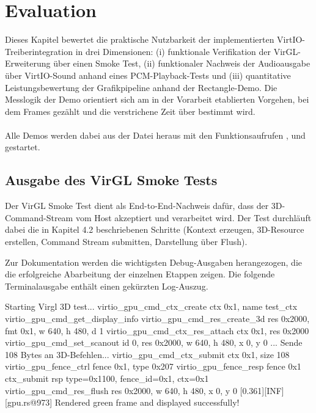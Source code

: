 \chapter{Evaluation}

Dieses Kapitel bewertet die praktische Nutzbarkeit der implementierten VirtIO-Treiberint\-egration in drei Dimensionen: (i) funktionale Verifikation der VirGL-Erweiterung über einen Smoke Test, (ii) funktionaler Nachweis der Audioausgabe über VirtIO-Sound anhand eines PCM-Playback-Tests und (iii) quantitative Leistungsbewertung der Grafikpipeline anhand der Rectangle-Demo. Die Messlogik der Demo orientiert sich am in der Vorarbeit etablierten Vorgehen, bei dem Frames gezählt und die verstrichene Zeit über  bestimmt wird.\\
\\
Alle Demos werden dabei aus der  Datei heraus mit den Funktionsaufrufen ,  und  gestartet.

\section{Ausgabe des VirGL Smoke Tests}

Der VirGL Smoke Test  dient als End-to-End-Nachweis dafür, dass der 3D-Command-Stream vom Host akzeptiert und verarbeitet wird. Der Test durchläuft dabei die in Kapitel 4.2 beschriebenen Schritte (Kontext erzeugen, 3D-Resource erstellen, Command Stream submitten, Darstellung über Flush).

Zur Dokumentation werden die wichtigsten Debug-Ausgaben herangezogen, die die erfolgreiche Abarbeitung der einzelnen Etappen zeigen. Die folgende Terminalausgabe enthält einen gekürzten Log-Auszug.

\begin{terminalblock}
  \begin{textcode}
[0.274][INF][gpu.rs@904] Starting Virgl 3D test...
virtio_gpu_cmd_ctx_create ctx 0x1, name test_ctx
virtio_gpu_cmd_get_display_info
virtio_gpu_cmd_res_create_3d res 0x2000, fmt 0x1, w 640, h 480, d 1
virtio_gpu_cmd_ctx_res_attach ctx 0x1, res 0x2000
virtio_gpu_cmd_set_scanout id 0, res 0x2000, w 640, h 480, x 0, y 0
...
Sende 108 Bytes an 3D-Befehlen...
virtio_gpu_cmd_ctx_submit ctx 0x1, size 108
virtio_gpu_fence_ctrl fence 0x1, type 0x207
virtio_gpu_fence_resp fence 0x1
ctx_submit rsp type=0x1100, fence_id=0x1, ctx=0x1
virtio_gpu_cmd_res_flush res 0x2000, w 640, h 480, x 0, y 0
[0.361][INF][gpu.rs@973] Rendered green frame and displayed successfully!
  \end{textcode}
\end{terminalblock}

